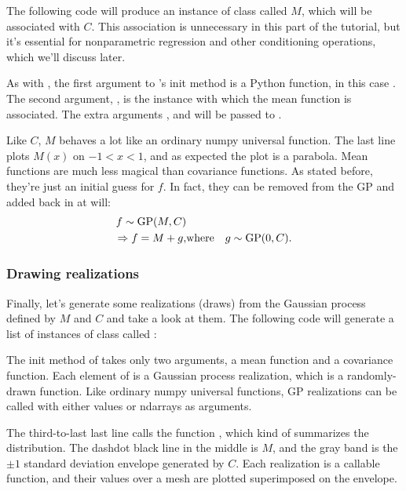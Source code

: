 \documentclass{manual}
\begin{document}
The following code will produce an instance of class  called $M$, which will be associated with $C$. This association is unnecessary in this part of the tutorial, but it's essential for nonparametric regression and other conditioning operations, which we'll discuss later.


As with , the first argument to 's init method is a Python function, in this case . The second argument, , is the  instance with which the mean function is associated. The extra arguments ,   and  will be passed to .

Like $C$, $M$ behaves a lot like an ordinary numpy universal function. The last line plots $M(x)$ on $-1<x<1$, and as expected the plot is a parabola. Mean functions are much less magical than covariance functions. As stated before, they're just an initial guess for $f$. In fact, they can be removed from the GP and added back in at will:
\begin{eqnarray}
	f\sim\textup{GP}(M,C)\\
	\Rightarrow f = M + g,&\textup{where}&
	g \sim\textup{GP}(0,C).
\end{eqnarray}

\subsubsection{Drawing realizations}\label{subsub:realizations}
Finally, let's generate some realizations (draws) from the Gaussian process defined by $M$ and $C$ and take a look at them. The following code will generate a list of instances of class  called :


The init method of  takes only two arguments, a mean function and a covariance function. Each element of  is a Gaussian process realization, which is a randomly-drawn function. Like ordinary numpy universal functions, GP realizations can be called with either values or ndarrays as arguments.

The third-to-last last line calls the function , which kind of summarizes the distribution. The dashdot black line in the middle is $M$, and the gray band is the $\pm 1$ standard deviation envelope generated by $C$. Each realization is a callable function, and their values over a mesh are plotted superimposed on the envelope.
\end{document}

